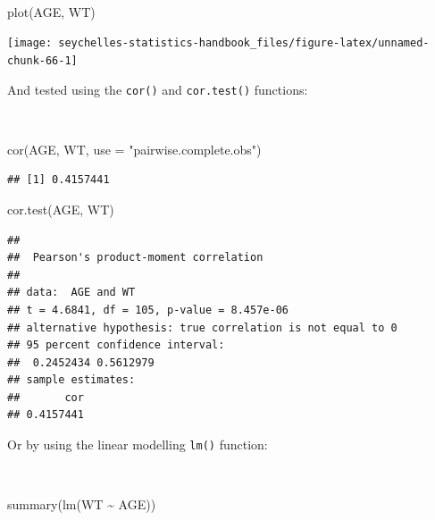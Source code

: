 \documentclass[
  12pt,
]{book}
\newenvironment{Shaded}{\begin{snugshade}}{\end{snugshade}}
\newcommand{\AttributeTok}[1]{\textcolor[rgb]{0.77,0.63,0.00}{#1}}
\newcommand{\FunctionTok}[1]{\textcolor[rgb]{0.00,0.00,0.00}{#1}}
\newcommand{\NormalTok}[1]{#1}
\newcommand{\SpecialCharTok}[1]{\textcolor[rgb]{0.00,0.00,0.00}{#1}}
\newcommand{\StringTok}[1]{\textcolor[rgb]{0.31,0.60,0.02}{#1}}
\begin{document}
~

\begin{Shaded}
\begin{Highlighting}[]
\FunctionTok{plot}\NormalTok{(AGE, WT)}
\end{Highlighting}
\end{Shaded}

\begin{center}\texttt{[image: seychelles-statistics-handbook\_files/figure-latex/unnamed-chunk-66-1]} \end{center}

\newpage

And tested using the \texttt{cor()} and \texttt{cor.test()} functions:

~

\begin{Shaded}
\begin{Highlighting}[]
\FunctionTok{cor}\NormalTok{(AGE, WT, }\AttributeTok{use =} \StringTok{"pairwise.complete.obs"}\NormalTok{)}
\end{Highlighting}
\end{Shaded}

\begin{verbatim}
## [1] 0.4157441
\end{verbatim}

\begin{Shaded}
\begin{Highlighting}[]
\FunctionTok{cor.test}\NormalTok{(AGE, WT)}
\end{Highlighting}
\end{Shaded}

\begin{verbatim}
## 
##  Pearson's product-moment correlation
## 
## data:  AGE and WT
## t = 4.6841, df = 105, p-value = 8.457e-06
## alternative hypothesis: true correlation is not equal to 0
## 95 percent confidence interval:
##  0.2452434 0.5612979
## sample estimates:
##       cor 
## 0.4157441
\end{verbatim}

\newpage

Or by using the linear modelling \texttt{lm()} function:

~

\begin{Shaded}
\begin{Highlighting}[]
\FunctionTok{summary}\NormalTok{(}\FunctionTok{lm}\NormalTok{(WT }\SpecialCharTok{\textasciitilde{}}\NormalTok{ AGE))}
\end{Highlighting}
\end{Shaded}
\end{document}
